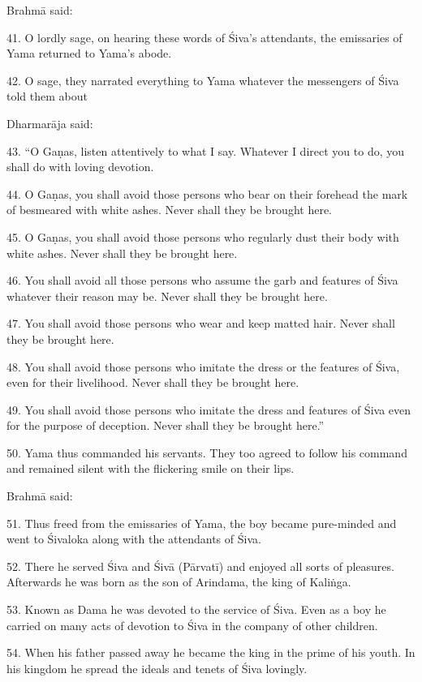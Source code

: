 Brahmā said:

41. O lordly sage, on hearing these words of Śiva’s attendants, the emissaries
of Yama returned to Yama’s abode.

42. O sage, they narrated everything to Yama whatever the messengers of Śiva
told them about  \etc

Dharmarāja said:

43. “O Gaṇas, listen attentively to what I say. Whatever I direct you to do, you
shall do with loving devotion.

44. O Gaṇas, you shall avoid those persons who bear on their forehead the mark
of  besmeared with white ashes. Never shall they be brought here.

45. O Gaṇas, you shall avoid those persons who regularly dust their body with
white ashes. Never shall they be brought here.

46. You shall avoid all those persons who assume the garb and features of Śiva
whatever their reason may be. Never shall they be brought here.

47. You shall avoid those persons who wear  and keep matted hair.
Never shall they be brought here.

48. You shall avoid those persons who imitate the dress or the features of Śiva,
even for their livelihood. Never shall they be brought here.

49. You shall avoid those persons who imitate the dress and features of Śiva
even for the purpose of deception. Never shall they be brought here.”

50. Yama thus commanded his servants. They too agreed to follow his command and
remained silent with the flickering smile on their lips.

Brahmā said:

51. Thus freed from the emissaries of Yama, the  boy became
pure-minded and went to Śivaloka along with the attendants of Śiva.

52. There he served Śiva and Śivā (Pārvatī) and enjoyed all sorts of pleasures.
Afterwards he was born as the son of Arindama, the king of Kaliṅga.

53. Known as Dama he was devoted to the service of Śiva. Even as a boy he
carried on many acts of devotion to Śiva in the company of other children.

54. When his father passed away he became the king in the prime of his youth. In
his kingdom he spread the ideals and tenets of Śiva lovingly.

